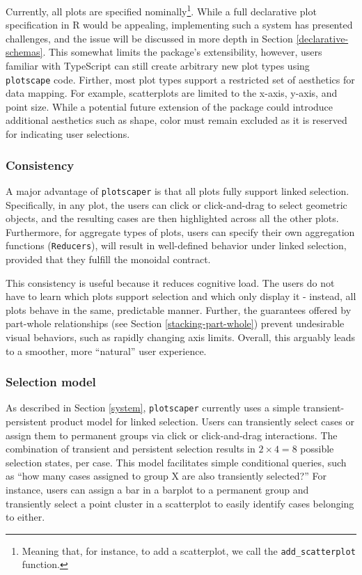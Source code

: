 \documentclass[
  openany]{book}
\theoremstyle{definition}
\theoremstyle{definition}
\theoremstyle{definition}
\theoremstyle{definition}
\theoremstyle{remark}
\begin{document}
Currently, all plots are specified nominally\footnote{Meaning that, for instance, to add a scatterplot, we call the \texttt{add\_scatterplot} function.}. While a full declarative plot specification in R would be appealing, implementing such a system has presented challenges, and the issue will be discussed in more depth in Section \ref{declarative-schemas}. This somewhat limits the package's extensibility, however, users familiar with TypeScript can still create arbitrary new plot types using \texttt{plotscape} code. Firther, most plot types support a restricted set of aesthetics for data mapping. For example, scatterplots are limited to the x-axis, y-axis, and point size. While a potential future extension of the package could introduce additional aesthetics such as shape, color must remain excluded as it is reserved for indicating user selections.

\subsubsection{Consistency}\label{consistency}

A major advantage of \texttt{plotscaper} is that all plots fully support linked selection. Specifically, in any plot, the users can click or click-and-drag to select geometric objects, and the resulting cases are then highlighted across all the other plots. Furthermore, for aggregate types of plots, users can specify their own aggregation functions (\texttt{Reducers}), will result in well-defined behavior under linked selection, provided that they fulfill the monoidal contract.

This consistency is useful because it reduces cognitive load. The users do not have to learn which plots support selection and which only display it - instead, all plots behave in the same, predictable manner. Further, the guarantees offered by part-whole relationships (see Section \ref{stacking-part-whole}) prevent undesirable visual behaviors, such as rapidly changing axis limits. Overall, this arguably leads to a smoother, more ``natural'' user experience.

\subsubsection{Selection model}\label{selection-model}

As described in Section \ref{system}, \texttt{plotscaper} currently uses a simple transient-persistent product model for linked selection. Users can transiently select cases or assign them to permanent groups via click or click-and-drag interactions. The combination of transient and persistent selection results in \(2 \times 4 = 8\) possible selection states, per case. This model facilitates simple conditional queries, such as ``how many cases assigned to group X are also transiently selected?'' For instance, users can assign a bar in a barplot to a permanent group and transiently select a point cluster in a scatterplot to easily identify cases belonging to either.
\end{document}

